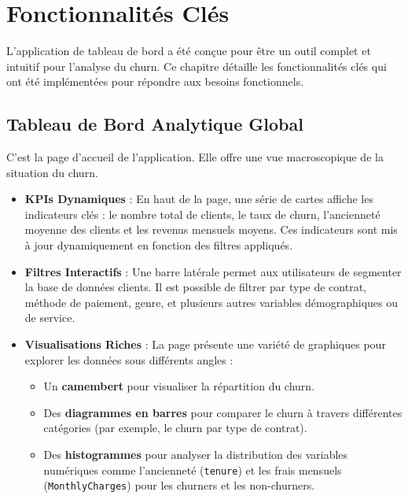 \chapter{Fonctionnalités Clés}
\label{chap:fonctionnalites}

L'application de tableau de bord a été conçue pour être un outil complet et intuitif pour l'analyse du churn. Ce chapitre détaille les fonctionnalités clés qui ont été implémentées pour répondre aux besoins fonctionnels.

\section{Tableau de Bord Analytique Global}
C'est la page d'accueil de l'application. Elle offre une vue macroscopique de la situation du churn.
\begin{itemize}
    \item \textbf{KPIs Dynamiques} : En haut de la page, une série de cartes affiche les indicateurs clés : le nombre total de clients, le taux de churn, l'ancienneté moyenne des clients et les revenus mensuels moyens. Ces indicateurs sont mis à jour dynamiquement en fonction des filtres appliqués.
    \item \textbf{Filtres Interactifs} : Une barre latérale permet aux utilisateurs de segmenter la base de données clients. Il est possible de filtrer par type de contrat, méthode de paiement, genre, et plusieurs autres variables démographiques ou de service.
    \item \textbf{Visualisations Riches} : La page présente une variété de graphiques pour explorer les données sous différents angles :
    \begin{itemize}
        \item Un \textbf{camembert} pour visualiser la répartition du churn.
        \item Des \textbf{diagrammes en barres} pour comparer le churn à travers différentes catégories (par exemple, le churn par type de contrat).
        \item Des \textbf{histogrammes} pour analyser la distribution des variables numériques comme l'ancienneté (\texttt{tenure}) et les frais mensuels (\texttt{MonthlyCharges}) pour les churners et les non-churners.
    \end{itemize}
\end{itemize}

